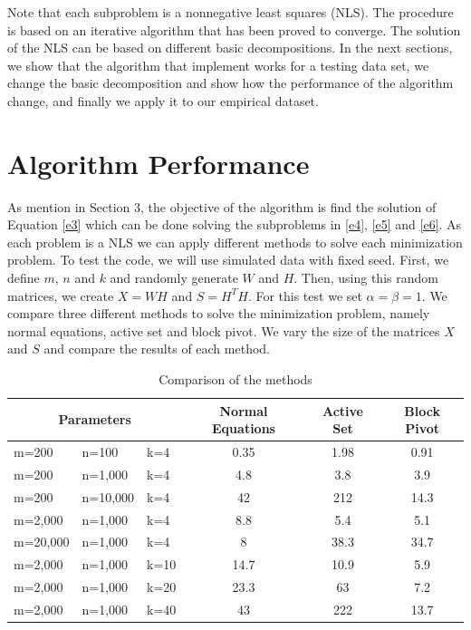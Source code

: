 \documentclass[11pt,letter]{article}%
\numberwithin{equation}{section}
\begin{document}
Note that each subproblem is a nonnegative least squares (NLS). The procedure is based on an iterative algorithm that has been proved to converge. The solution of the NLS can be based on different basic decompositions. In the next sections, we show that the algorithm that implement works for a testing data set, we change the basic decomposition and show how the performance of the algorithm change, and finally we apply it to our empirical dataset.  

\section{Algorithm Performance}

As mention in Section 3, the objective of the algorithm is find the solution of Equation \ref{e3} which can be done solving the subproblems in \ref{e4}, \ref{e5} and \ref{e6}. As each problem is a NLS we can apply different methods to solve each minimization problem. To test the code, we will use simulated data with fixed seed. First, we define $m$, $n$ and $k$ and randomly generate $W$ and $H$. Then, using this random matrices, we create $X=WH$ and $S=H^{T}H$. For this test we set $\alpha=\beta=1$. We compare three different methods to solve the minimization problem, namely normal equations, active set and block pivot. We vary the size of the matrices $X$ and $S$ and compare the results of each method. 

\begin{table}[H]
	\centering
	\caption{Comparison of the methods}
	\label{t1}
	\begin{tabular}{lllccc}
	\hline
	\multicolumn{3}{c}{Parameters} &	Normal Equations	&	Active Set	&
	Block Pivot	\\
	\hline
	m=200	&	n=100	&	k=4	&	0.35	&	1.98	&	0.91	\\
	m=200	&	n=1,000	&	k=4	&	4.8	&	3.8	&	3.9	\\
	m=200	&	n=10,000	&	k=4	&	42	&	212	&	14.3	\\
	m=2,000	&	n=1,000	&	k=4	&	8.8	&	5.4	&	5.1	\\
	m=20,000	&	n=1,000	&	k=4	&	8	&	38.3	&	34.7	\\
	m=2,000	&	n=1,000	&	k=10	&	14.7	&	10.9	&	5.9	\\
	m=2,000	&	n=1,000	&	k=20	&	23.3	&	63	&	7.2	\\
	m=2,000	&	n=1,000	&	k=40	&	43	&	222	&	13.7	\\
	\hline
\end{tabular}		
\end{table}
\end{document}
